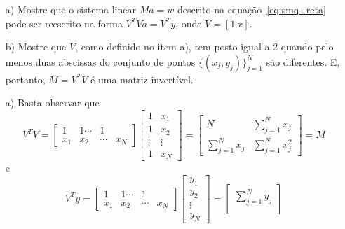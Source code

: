 \begin{exer}\label{exer:smq_reta}
  \begin{itemize}
  \item[a)] Mostre que o sistema linear $Ma = w$ descrito na equação~\ref{eq:smq_reta} pode ser reescrito na forma $V^TVa = V^Ty$, onde $V = [1~x]$.
  \item[b)] Mostre que $V$, como definido no item a), tem posto igual a 2 quando pelo menos duas abscissas do conjunto de pontos $\{(x_j, y_j)\}_{j=1}^N$ são diferentes. E, portanto, $M = V^TV$ é uma matriz invertível.
  \end{itemize}
\end{exer}
\begin{resp}
  
    \begin{itemize}
    \item[a)] Basta observar que
      \begin{equation*}
        V^TV = \begin{bmatrix}
          1 & 1 \cdots & 1\\
          x_1 & x_2 & \cdots & x_N
        \end{bmatrix}
        \begin{bmatrix}
          1 & x_1\\
          1 & x_2\\
          \vdots & \vdots\\
          1 & x_N
        \end{bmatrix} =
        \begin{bmatrix}
          N &  \sum_{j=1}^N x_j \\
          \sum_{j=1}^N x_j &  \sum_{j=1}^N x_j^2 
        \end{bmatrix} = M
      \end{equation*}
      e
      \begin{equation*}
        V^Ty = \begin{bmatrix}
          1 & 1 \cdots & 1\\
          x_1 & x_2 & \cdots & x_N
        \end{bmatrix}
        \begin{bmatrix}
          y_1\\
          y_2\\
          \vdots\\
          y_N
        \end{bmatrix} = 
        \begin{bmatrix}
          \sum_{j=1}^N y_j \\

\end{bmatrix}
\end{equation*}
\end{itemize}
\end{resp}
